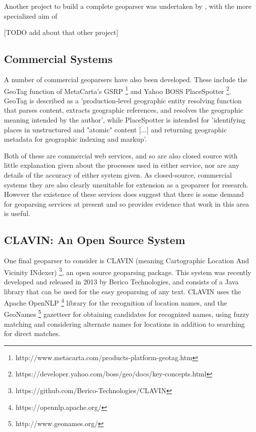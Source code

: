 \documentclass[12pt, a4paper]{report}
\begin{document}
Another project to build a complete geoparser was undertaken by \citet{tobin2010}, with the more specialized aim of 

[TODO add about that other project]

\subsection{Commercial Systems}
\label{subsec:commercial_systems}

A number of commercial geoparsers have also been developed. These include the GeoTag function of MetaCarta's GSRP \footnote{http://www.metacarta.com/products-platform-geotag.htm} and Yahoo BOSS PlaceSpotter \footnote{https://developer.yahoo.com/boss/geo/docs/key-concepts.html}. GeoTag is described as a 'production-level geographic entity resolving function that parses content, extracts geographic references, and resolves the geographic meaning intended by the author', while PlaceSpotter is intended for 'identifying places in unstructured and "atomic" content [...] and returning geographic metadata for geographic indexing and markup'.

Both of these are commercial web services, and so are also closed source with little explanation given about the processes used in either service, nor are any details of the accuracy of either system given. As closed-source, commercial systems they are also clearly unsuitable for extension as a geoparser for research. However the existence of these services does suggest that there is some demand for geoparsing services at present and so provides evidence that work in this area is useful.
 
\subsection{CLAVIN: An Open Source System}
\label{subsec:clavin}

One final geoparser to consider is CLAVIN (meaning Cartographic Location And Vicinity INdexer) \footnote{https://github.com/Berico-Technologies/CLAVIN}, an open source geoparsing package. This system was recently developed and released in 2013 by Berico Technologies, and consists of a Java library that can be used for the easy geoparsing of any text. CLAVIN uses the Apache OpenNLP \footnote{https://opennlp.apache.org/} library for the recognition of location names, and the GeoNames \footnote{http://www.geonames.org/} gazetteer for obtaining candidates for recognized names, using fuzzy matching and considering alternate names for locations in addition to searching for direct matches.
\end{document}

